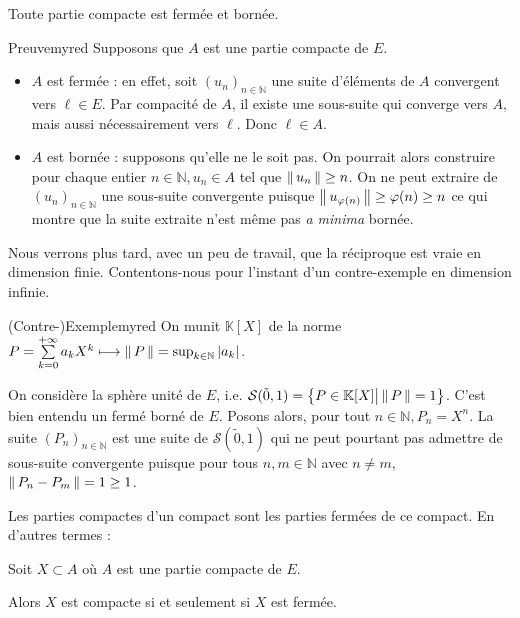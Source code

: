     \begin{theo}{}{}
        Toute partie compacte est fermée et bornée.
    \end{theo}

    \begin{demo}{Preuve}{myred}
        Supposons que $A$ est une partie compacte de $E$.
        \begin{itemize}
            \item $A$ est fermée : en effet, soit $(u_n)_{n \in \mathbb{N}}$ une suite d’éléments de $A$ convergent vers $\ell \in E$. Par compacité de $A$, il existe une sous-suite qui converge vers $A$, mais aussi nécessairement vers $\ell$. Donc $\ell \in A$.
            \item $A$ est bornée : supposons qu’elle ne le soit pas. On pourrait alors construire pour chaque entier $n \in \mathbb{N}, u_n \in A$ tel que $\left\lVert\,u_n\,\right\rVert \geq n$. On ne peut extraire de $(u_n)_{n \in \mathbb{N}}$ une sous-suite convergente puisque $\left\lVert\,u_{\varphi(n)}\,\right\rVert \geq \varphi(n) \geq n$ ce qui montre que la suite extraite n’est même pas \textit{a minima} bornée.
        \end{itemize}
    \end{demo}

    Nous verrons plus tard, avec un peu de travail, que la réciproque est vraie en dimension finie. Contentons-nous pour l’instant d’un contre-exemple en dimension infinie.

    \begin{omed}{(Contre-)Exemple}{myred}
        On munit $\mathbb{K}[X]$ de la norme $P = \sum\limits_{k=0}^{+\infty} a_k X^k \longmapsto \left\lVert\,P\,\right\rVert = \sup_{k \in \mathbb{N}} \left\lvert a_k\right\rvert$.

        On considère la sphère unité de $E$, i.e. $\mathcal{S}(\tilde{0},1) = \big\{ P \in \mathbb{K}[X] \big| \left\lVert\,P\,\right\rVert = 1 \big\}$. C’est bien entendu un fermé borné de $E$. Posons alors, pour tout $n \in \mathbb{N}, P_n = X^n$. La suite $(P_n)_{n \in \mathbb{N}}$ est une suite de $\mathcal{S}(\tilde{0},1)$ qui ne peut pourtant pas admettre de sous-suite convergente puisque pour tous $n,m \in \mathbb{N}$ avec $n \neq m$, $\left\lVert\,P_n - P_m\,\right\rVert = 1 \geq 1$.
    \end{omed}

    Les parties compactes d’un compact sont les parties fermées de ce compact. En d’autres termes : 

    \begin{prop}{}{}
        Soit $X \subset A$ où $A$ est une partie compacte de $E$. 

        Alors $X$ est compacte si et seulement si $X$ est fermée.
    \end{prop}

